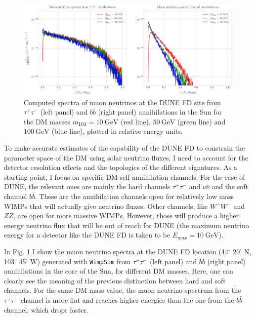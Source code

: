 \begin{figure}[t]
	\centering
	\includegraphics[width=1\linewidth]{Images/DM_Analysis/solardm_nu_mu_spectra.pdf}
	\caption[Computed spectra of muon neutrinos at the DUNE FD site from $\tau^{+} \tau^{-}$ and $b\bar{b}$ annihilations in the Sun for different DM masses.]{Computed spectra of muon neutrinos at the DUNE FD site from $\tau^{+} \tau^{-}$ (left panel) and $b\bar{b}$ (right panel) annihilations in the Sun for the DM masses $m_{\mathrm{DM}} = 10 \ \mathrm{GeV}$ (red line), $50 \ \mathrm{GeV}$ (green line) and $100 \ \mathrm{GeV}$ (blue line), plotted in relative energy units.}
	\label{fig:solardm_nu_mu_spectra}
\end{figure}

To make accurate estimates of the capability of the DUNE FD to constrain the parameter space of the DM using solar neutrino fluxes, I need to account for the detector resolution effects and the topologies of the different signatures. As a starting point, I focus on specific DM self-annihilation channels. For the case of DUNE, the relevant ones are mainly the hard channels $\tau^{+} \tau^{-}$ and $\nu \bar{\nu}$ and the soft channel $b\bar{b}$. These are the annihilation channels open for relatively low mass WIMPs that will actually give neutrino fluxes. Other channels, like $W^{+} W^{-}$ and $ZZ$, are open for more massive WIMPs. However, those will produce a higher energy neutrino flux that will be out of reach for DUNE (the maximum neutrino energy for a detector like the DUNE FD is taken to be $E_{max} = 10 \ \mathrm{GeV}$).

In Fig. \ref{fig:solardm_nu_mu_spectra} I show the muon neutrino spectra at the DUNE FD location (44$^{\circ} $ 20' N, 103$^{\circ} $ 45' W) generated with \texttt{WimpSim} \cite{WimpSim} from $\tau^{+} \tau^{-}$ (left panel) and $b\bar{b}$ (right panel) annihilations in the core of the Sun, for different DM masses. Here, one can clearly see the meaning of the previous distinction between hard and soft channels. For the same DM mass value, the muon neutrino spectrum from the $\tau^{+} \tau^{-}$ channel is more flat and reaches higher energies than the one from the $b\bar{b}$ channel, which drops faster.

